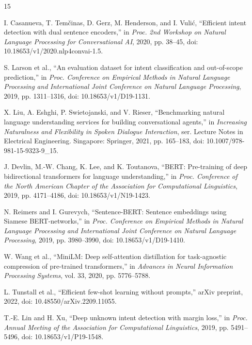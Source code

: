 \begin{thebibliography}{15}

 I. Casanueva, T. Tem\v{c}inas, D. Gerz, M. Henderson, and I. Vuli\'{c}, ``Efficient intent detection with dual sentence encoders,'' in \emph{Proc. 2nd Workshop on Natural Language Processing for Conversational AI}, 2020, pp. 38--45, doi: 10.18653/v1/2020.nlp4convai-1.5.

 S. Larson et al., ``An evaluation dataset for intent classification and out-of-scope prediction,'' in \emph{Proc. Conference on Empirical Methods in Natural Language Processing and International Joint Conference on Natural Language Processing}, 2019, pp. 1311--1316, doi: 10.18653/v1/D19-1131.

 X. Liu, A. Eshghi, P. Swietojanski, and V. Rieser, ``Benchmarking natural language understanding services for building conversational agents,'' in \emph{Increasing Naturalness and Flexibility in Spoken Dialogue Interaction}, ser. Lecture Notes in Electrical Engineering. Singapore: Springer, 2021, pp. 165--183, doi: 10.1007/978-981-15-9323-9\_15.

 J. Devlin, M.-W. Chang, K. Lee, and K. Toutanova, ``BERT: Pre-training of deep bidirectional transformers for language understanding,'' in \emph{Proc. Conference of the North American Chapter of the Association for Computational Linguistics}, 2019, pp. 4171--4186, doi: 10.18653/v1/N19-1423.

 N. Reimers and I. Gurevych, ``Sentence-BERT: Sentence embeddings using Siamese BERT-networks,'' in \emph{Proc. Conference on Empirical Methods in Natural Language Processing and International Joint Conference on Natural Language Processing}, 2019, pp. 3980--3990, doi: 10.18653/v1/D19-1410.

 W. Wang et al., ``MiniLM: Deep self-attention distillation for task-agnostic compression of pre-trained transformers,'' in \emph{Advances in Neural Information Processing Systems}, vol. 33, 2020, pp. 5776--5788.

 L. Tunstall et al., ``Efficient few-shot learning without prompts,'' arXiv preprint, 2022, doi: 10.48550/arXiv.2209.11055.

 T.-E. Lin and H. Xu, ``Deep unknown intent detection with margin loss,'' in \emph{Proc. Annual Meeting of the Association for Computational Linguistics}, 2019, pp. 5491--5496, doi: 10.18653/v1/P19-1548.


\end{thebibliography}

